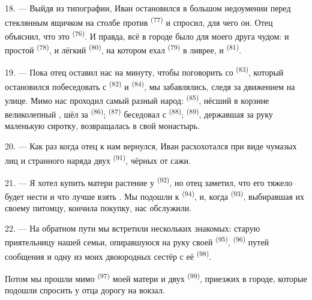 \VUsaut{3.0mm}

18. --- Выйдя из типографии, Иван остановился в большом недоумении перед
стеклянным ящичком на столбе против 
\textsuperscript{(77)} и спросил, для чего он. Отец объяснил, что это
 \textsuperscript{(76)}. И правда, всё в городе было
для моего друга чудом: и простой  \textsuperscript{(78)},
и лёгкий  \textsuperscript{(80)}, на котором ехал
 \textsuperscript{(79)} в ливрее, и 
\textsuperscript{(81)}.

19. --- Пока отец оставил нас на минуту, чтобы поговорить со
 \textsuperscript{(83)}, который остановился побеседовать
с  \textsuperscript{(82)} и  \textsuperscript{(84)},
мы забавлялись, следя за движением на улице. Мимо нас проходил самый
разный народ:  \textsuperscript{(85)}, нёсший в
корзине великолепный , шёл за 
\textsuperscript{(86)};  \textsuperscript{(87)} беседовал с
 \textsuperscript{(88)};  \textsuperscript{(89)},
державшая за руку маленькую сиротку, возвращалась в свой монастырь.

\VUsaut{3.0mm}

20. --- Как раз когда отец к нам вернулся, Иван расхохотался при виде
чумазых лиц и странного наряда двух  \textsuperscript{(91)},
чёрных от сажи.

21. --- Я хотел купить матери растение у  \textsuperscript{(92)},
но отец заметил, что его тяжело будет нести и что лучше взять
. Мы подошли к  \textsuperscript{(94)},
и, когда  \textsuperscript{(93)}, выбиравшая их своему
питомцу, кончила покупку, нас обслужили.

22. --- На обратном пути мы встретили нескольких знакомых: старую приятельницу
нашей семьи, опиравшуюся на руку своей  \textsuperscript{(95)},
 \textsuperscript{(96)} путей сообщения и одну из моих
двоюродных сестёр с её  \textsuperscript{(98)}.

Потом мы прошли мимо  \textsuperscript{(97)} моей матери и двух
 \textsuperscript{(99)}, приезжих в городе, которые подошли
спросить у отца дорогу на вокзал.
\VUsaut{6.0mm}
\VUfilet{22mm}
